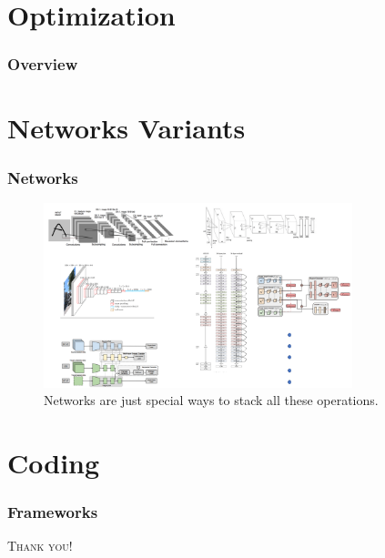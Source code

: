 \documentclass[10pt]{beamer}
\begin{document}
\section{Optimization}
\begin{frame}
	\frametitle{Overview}
\end{frame}

\section{Networks Variants}
\begin{frame}
\frametitle{Networks}
	\begin{figure}[H]
	\centerline{
		\includegraphics[width=0.8\textwidth]{networks.png}
	}
	\caption{Networks are just special ways to stack all these operations.}
\end{figure}
\end{frame}

\section{Coding}
\begin{frame}
\frametitle{Frameworks}
\end{frame}

\begin{frame}
	\begin{center}
		{\textcolor[rgb]{1 0 0}{\Huge\textsc{Thank you!}}}\bigskip
	\end{center}
\end{frame}
\end{document}
